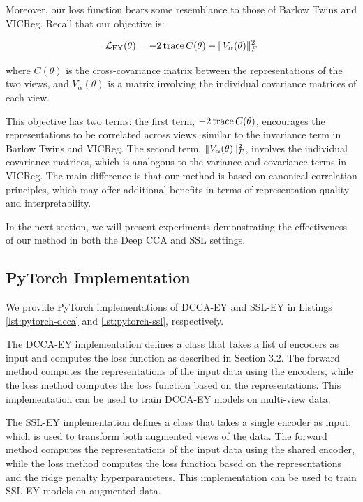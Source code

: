 Moreover, our loss function bears some resemblance to those of Barlow Twins and VICReg. Recall that our objective is:

\begin{align*}
    \mathcal{L}_\text{EY}(\theta) = - 2 \operatorname{trace} C(\theta) + \lVert V_\alpha(\theta)\rVert_F^2
\end{align*}

where $C(\theta)$ is the cross-covariance matrix between the representations of the two views, and $V_\alpha(\theta)$ is a matrix involving the individual covariance matrices of each view.

This objective has two terms: the first term, $- 2 \operatorname{trace} C(\theta)$, encourages the representations to be correlated across views, similar to the invariance term in Barlow Twins and VICReg. The second term, $\lVert V_\alpha(\theta)\rVert_F^2$, involves the individual covariance matrices, which is analogous to the variance and covariance terms in VICReg. The main difference is that our method is based on canonical correlation principles, which may offer additional benefits in terms of representation quality and interpretability.

In the next section, we will present experiments demonstrating the effectiveness of our method in both the Deep CCA and SSL settings.

\subsection{PyTorch Implementation}

We provide PyTorch implementations of DCCA-EY and SSL-EY in Listings \ref{lst:pytorch-dcca} and \ref{lst:pytorch-ssl}, respectively.

The DCCA-EY implementation defines a class that takes a list of encoders as input and computes the loss function as described in Section 3.2. The forward method computes the representations of the input data using the encoders, while the loss method computes the loss function based on the representations. This implementation can be used to train DCCA-EY models on multi-view data.

The SSL-EY implementation defines a class that takes a single encoder as input, which is used to transform both augmented views of the data. The forward method computes the representations of the input data using the shared encoder, while the loss method computes the loss function based on the representations and the ridge penalty hyperparameters. This implementation can be used to train SSL-EY models on augmented data.

